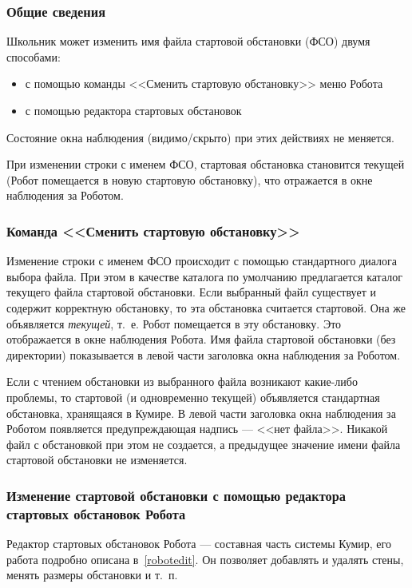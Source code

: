\subsubsection{Общие сведения}

Школьник может изменить имя файла стартовой обстановки (ФСО) двумя способами:
\begin{itemize}
\item с помощью команды <<Сменить стартовую обстановку>> меню Робота
\item с помощью редактора стартовых обстановок
\end{itemize}
Состояние окна наблюдения (видимо/скрыто) при этих действиях не меняется.

При изменении строки с именем ФСО, стартовая обстановка становится текущей (Робот помещается в новую стартовую обстановку), что отражается в окне наблюдения за Роботом.
	
\subsubsection[Команда ''Сменить стартовую обстановку'']{Команда <<Сменить стартовую обстановку>>}

Изменение строки с именем ФСО происходит с помощью стандартного диалога выбора файла. При этом в качестве каталога по умолчанию предлагается каталог текущего файла стартовой обстановки. Если выбранный файл существует и содержит корректную обстановку, то эта обстановка считается стартовой. Она же объявляется \emph{текущей}, т.~е. Робот помещается в эту обстановку. Это отображается в окне наблюдения Робота. Имя файла стартовой обстановки (без директории) показывается в левой части заголовка окна наблюдения за Роботом.

Если с чтением обстановки из выбранного файла возникают какие-либо проблемы, то стартовой (и одновременно текущей) объявляется стандартная обстановка, хранящаяся в Кумире. В левой части заголовка окна наблюдения за Роботом появляется предупреждающая надпись --- <<нет файла>>. Никакой файл с обстановкой при этом не создается, а предыдущее значение имени файла стартовой обстановки не изменяется.

\subsubsection{Изменение стартовой обстановки с помощью редактора стартовых обстановок Робота}

Редактор стартовых обстановок Робота --- составная часть системы Кумир, его работа подробно описана в~\ref{robotedit}. Он позволяет добавлять и удалять стены, менять размеры обстановки и т.~п.

